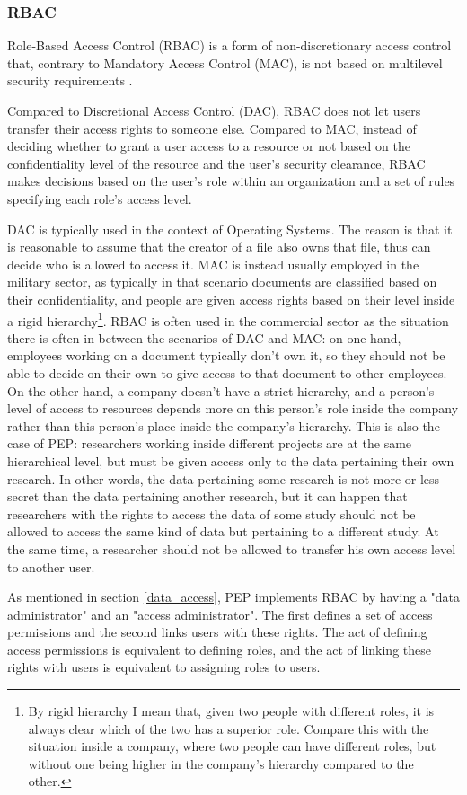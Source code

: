 \documentclass{report}
\begin{document}
\subsubsection{RBAC}
Role-Based Access Control (RBAC) is a form of non-discretionary access control that, contrary to Mandatory Access Control (MAC), is not based on multilevel security requirements \cite{rbac}. \par
Compared to Discretional Access Control (DAC), RBAC does not let users transfer their access rights to someone else. Compared to MAC, instead of deciding whether to grant a user access 
to a resource or not based on the confidentiality level of the resource and the user's security clearance, RBAC makes decisions based on the user's role within an organization and a set 
of rules specifying each role's access level. \par
DAC is typically used in the context of Operating Systems. The reason is that it is reasonable to assume that the creator of a file also owns that file, thus can decide who is
allowed to access it. MAC is instead usually employed in the military sector, as typically in that scenario documents are classified based on their confidentiality, and people are
given access rights based on their level inside a rigid hierarchy\footnote{By rigid hierarchy I mean that, given two people with different roles, it is always clear which of the two 
has a superior role. Compare this with the situation inside a company, where two people can have different roles, but without one being higher in the company's hierarchy compared to
the other.}. RBAC is often used in the commercial sector as the situation there is often in-between the scenarios of DAC and MAC: on one hand, employees working on a document
typically don't own it, so they should not be able to decide on their own to give access to that document to other employees. On the other hand, a company doesn't have a strict
hierarchy, and a person's level of access to resources depends more on this person's role inside the company rather than this person's place inside the company's hierarchy. This is
also the case of PEP: researchers working inside different projects are at the same hierarchical level, but must be given access only to the data pertaining their own research. In
other words, the data pertaining some research is not more or less secret than the data pertaining another research, but it can happen that researchers with the rights to access
the data of some study should not be allowed to access the same kind of data but pertaining to a different study. At the same time, a researcher should not be allowed to transfer his
own access level to another user. \par
As mentioned in section \ref{data_access}, PEP implements RBAC by having a "data administrator" and an "access administrator". The first defines a set of access permissions and the
second links users with these rights. The act of defining access permissions is equivalent to defining roles, and the act of linking these rights with users is equivalent to assigning
roles to users. 
\end{document}

